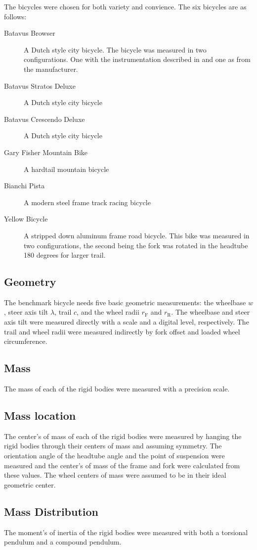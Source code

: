 \documentclass{bmd2010a}
\begin{document}
The bicycles were chosen for both variety and convience. The six bicycles are as follows:
\begin{description}
    \item[Batavus Browser] A Dutch style city bicycle. The bicycle was measured
        in two configurations. One with the instrumentation described in
        \cite{Kooijman2009a} and one as from the manufacturer.
    \item[Batavus Stratos Deluxe] A Dutch style city bicycle
    \item[Batavus Crescendo Deluxe] A Dutch style city bicycle
    \item[Gary Fisher Mountain Bike] A hardtail mountain bicycle
    \item[Bianchi Pista] A modern steel frame track racing bicycle
    \item[Yellow Bicycle] A stripped down aluminum frame road bicycle. This
        bike was measured in two configurations, the second being the fork was
        rotated in the headtube 180 degrees for larger trail.
\end{description}
\subsection{Geometry}
The benchmark bicycle needs five basic geometric measurements: the wheelbase
$w$, steer axis tilt $\lambda$, trail $c$, and the wheel radii $r_\mathrm{F}$
and $r_\mathrm{R}$. The wheelbase and steer axis tilt were measured directly
with a scale and a digital level, respectively. The trail and wheel radii were
measured indirectly by fork offset and loaded wheel circumference.
\subsection{Mass}
The mass of each of the rigid bodies were measured with a precision scale.
\subsection{Mass location}
The center's of mass of each of the rigid bodies were measured by hanging the
rigid bodies through their centers of mass and assuming symmetry. The
orientation angle of the headtube angle and the point of suspension were
measured and the center's of mass of the frame and fork were calculated from
these values. The wheel centers of mass were assumed to be in their ideal
geometric center.
\subsection{Mass Distribution}
The moment's of inertia of the rigid bodies were measured with both a torsional
pendulum and a compound pendulum.


\end{document}
